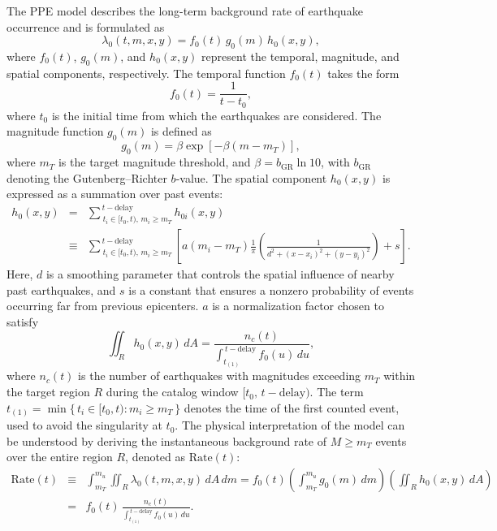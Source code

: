 \documentclass[extra,mreferee]{gji}
\theoremstyle{lemma}
\begin{document}
The PPE model \cite{JK} describes the long-term background rate of earthquake occurrence and is formulated as
\begin{equation}\label{l0}
    \lambda_0(t,m,x,y) = f_0(t)\, g_0(m)\, h_0(x,y),
\end{equation}
where $f_0(t)$, $g_0(m)$, and $h_0(x,y)$ represent the temporal, magnitude, and spatial components, respectively.  
The temporal function $f_0(t)$ takes the form
\begin{equation}\label{f0}
    f_0(t) = \frac{1}{t - t_0},
\end{equation}
where $t_0$ is the initial time from which the earthquakes are considered.  
The magnitude function $g_0(m)$ is defined as
\begin{equation}\label{g0}
    g_0(m) = \beta \exp\!\left[-\beta(m - m_T)\right],
\end{equation}
where $m_T$ is the target magnitude threshold, and $\beta = b_{\mathrm{GR}}\ln 10$, with $b_{\mathrm{GR}}$ denoting the Gutenberg--Richter $b$-value.  
The spatial component $h_0(x,y)$ is expressed as a summation over past events:
\begin{eqnarray}\label{h0}
 \nonumber h_0(x,y) & = & \sum\nolimits^{\,t-\mathrm{delay}}_{\;t_i \in [t_0,t),\,m_i \ge m_T} h_{0i}(x,y) \\
& \equiv & \sum\nolimits^{\,t-\mathrm{delay}}_{\;t_i \in [t_0,t),\,m_i \ge m_T} \!\left[a(m_i - m_T)\frac{1}{\pi}\!\left(\frac{1}{d^2 + (x - x_i)^2 + (y - y_i)^2}\right) + s\right].
\end{eqnarray}
Here, $d$ is a smoothing parameter that controls the spatial influence of nearby past earthquakes, and $s$ is a constant that ensures a nonzero probability of events occurring far from previous epicenters. $a$ is a normalization factor chosen to satisfy
\begin{equation}\label{nc}
\iint_R h_0(x,y)\,dA
= \frac{n_c(t)}{\displaystyle\int_{t_{(1)}}^{\,t-\mathrm{delay}}\! f_0(u)\,du},
\end{equation}
where $n_c(t)$ is the number of earthquakes with magnitudes exceeding $m_T$ within the target region $R$ during the catalog window $[t_0,\,t-\mathrm{delay})$. The term $t_{(1)} = \min\{\,t_i \in [t_0, t) : m_i \ge m_T\,\}$ denotes the time of the first counted event, used to avoid the singularity at $t_0$. The physical interpretation of the model can be understood by deriving the instantaneous background rate of $M \ge m_T$ events over the entire region $R$, denoted as $\mathrm{Rate}(t)$:
\begin{eqnarray*}
\mathrm{Rate}(t) & \equiv & \int_{m_T}^{m_u}\!\!\iint_R \lambda_0(t,m,x,y)\,dA\,dm  =  f_0(t)\!\left(\int_{m_T}^{m_u}\! g_0(m)\,dm\right)\!\left(\iint_R h_0(x,y)\,dA\right) \\
& = & f_0(t)\,\frac{n_c(t)}{\displaystyle\int_{t_{(1)}}^{\,t-\mathrm{delay}}\! f_0(u)\,du}.
\end{eqnarray*}
\end{document}
